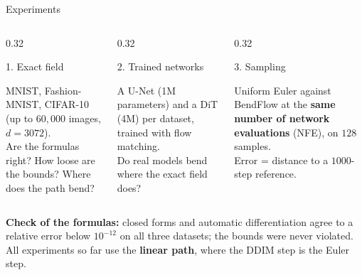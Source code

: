 \documentclass[aspectratio=169]{beamer}
\newcommand{\hl}[1]{\textcolor{coolpurple}{\textbf{#1}}}
\begin{document}
	\begin{frame}{Experiments}
		\begin{columns}[onlytextwidth, T]
			\begin{column}{0.32\textwidth}
				\begin{block}{1. Exact field}
					\footnotesize
					\begin{minipage}[t][3.3cm][t]{\linewidth}
						MNIST, Fashion-MNIST, CIFAR-10 (up to $60{,}000$ images, $d = 3072$).\\[0.3em]
						Are the formulas right? How loose are the bounds? Where does the path bend?
					\end{minipage}
				\end{block}
			\end{column}
			\begin{column}{0.32\textwidth}
				\begin{block}{2. Trained networks}
					\footnotesize
					\begin{minipage}[t][3.3cm][t]{\linewidth}
						A U-Net (1M parameters) and a DiT (4M) per dataset, trained with flow matching.\\[0.3em]
						Do real models bend where the exact field does?
					\end{minipage}
				\end{block}
			\end{column}
			\begin{column}{0.32\textwidth}
				\begin{block}{3. Sampling}
					\footnotesize
					\begin{minipage}[t][3.3cm][t]{\linewidth}
						Uniform Euler against BendFlow at the \hl{same number of network evaluations} (NFE), on $128$ samples.\\[0.3em]
						Error = distance to a $1000$-step reference.
					\end{minipage}
				\end{block}
			\end{column}
		\end{columns}
		\vspace{0.4em}
		\small \hl{Check of the formulas:} closed forms and automatic differentiation agree to a relative error below $10^{-12}$ on all three datasets; the bounds were never violated. All experiments so far use the \hl{linear path}, where the DDIM step is the Euler step.
	\end{frame}
\end{document}
